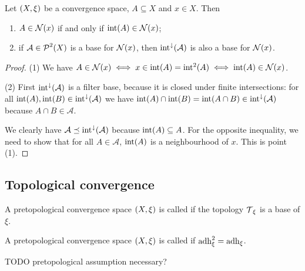 \begin{lemma} \label{interiorModificationNeighbourhoods}
Let $\left( X,\xi \right)$ be a convergence space, $A\subseteq X$ and $x\in X$. Then
\begin{enumerate}
\item $A\in\operatorname{\mathcal{N}}(x)$ \textup{if and only if} $\operatorname{int}(A)\in\operatorname{\mathcal{N}}(x)$;
\item if $\mathcal{A}\in\operatorname{\mathcal{P}}^2(X)$ is a base for $\operatorname{\mathcal{N}}(x)$, then $\operatorname{int}^{\downarrow}(\mathcal{A})$ is also a base for $\operatorname{\mathcal{N}}(x)$.
\end{enumerate}
\end{lemma}
\begin{proof}
(1) We have $A\in\operatorname{\mathcal{N}}(x) \iff x\in \operatorname{int}(A) = \operatorname{int}^2(A) \iff \operatorname{int}(A) \in \operatorname{\mathcal{N}}(x)$.

(2) First $\operatorname{int}^{\downarrow}(\mathcal{A})$ is a filter base, because it is closed under finite intersections: for all $\operatorname{int}(A),\operatorname{int}(B)\in \operatorname{int}^{\downarrow}(\mathcal{A})$ we have $\operatorname{int}(A)\cap\operatorname{int}(B) = \operatorname{int}(A\cap B) \in \operatorname{int}^{\downarrow}(\mathcal{A})$ because $A\cap B \in \mathcal{A}$.

We clearly have $\mathcal{A} \preceq \operatorname{int}^{\downarrow}(\mathcal{A})$ because $\operatorname{int}(A) \subseteq A$. For the opposite inequality, we need to show that for all $A\in \mathcal{A}$, $\operatorname{int}(A)$ is a neighbourhood of $x$. This is point (1).
\end{proof}





\subsection{Topological convergence}
\begin{definition}
A pretopological convergence space $\left( X,\xi \right)$ is called  if the topology $\operatorname{\mathcal{T}}_\xi$ is a base of $\xi$.
\end{definition}
\begin{definition}
A pretopological convergence space $\left( X,\xi \right)$ is called  if $\operatorname{adh}_\xi^2 = \operatorname{adh}_\xi$.
\end{definition}
TODO pretopological assumption necessary?

